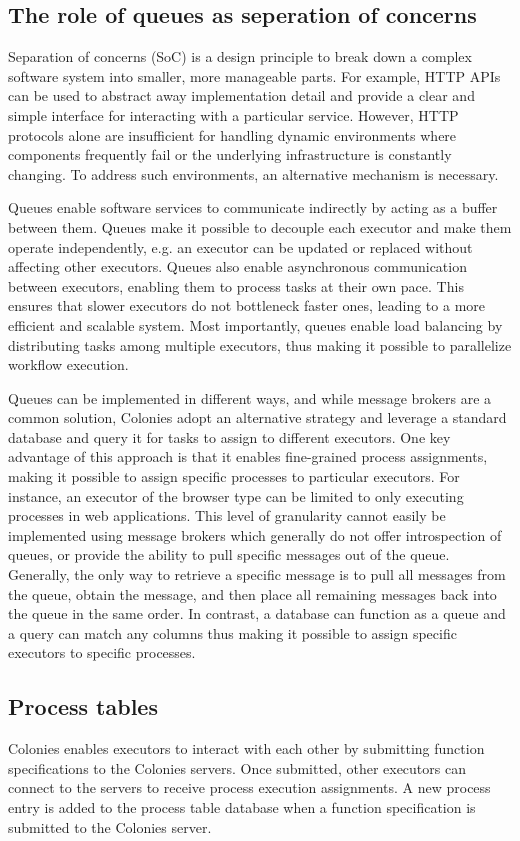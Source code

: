 \documentclass{article}
\begin{document}
\subsection{The role of queues as seperation of concerns}
Separation of concerns (SoC) is a design principle to break down a complex software system into smaller, more manageable parts. For example, HTTP APIs can be used to abstract away implementation detail and provide a clear and simple interface for interacting with a particular service. However, HTTP protocols alone are insufficient for handling dynamic environments where components frequently fail or the underlying infrastructure is constantly changing. To address such environments, an alternative mechanism is necessary. 

Queues enable software services to communicate indirectly by acting as a buffer between them. Queues make it possible to decouple each executor and make them operate independently, e.g. an executor can be updated or replaced without affecting other executors. Queues also enable asynchronous communication between executors, enabling them to process tasks at their own pace. This ensures that slower executors do not bottleneck faster ones, leading to a more efficient and scalable system. Most importantly, queues enable load balancing by distributing tasks among multiple executors, thus making it possible to parallelize workflow execution. 

Queues can be implemented in different ways, and while message brokers are a common solution, Colonies adopt an alternative strategy and leverage a standard database and query it for tasks to assign to different executors. One key advantage of this approach is that it enables fine-grained process assignments, making it possible to assign specific processes to particular executors. For instance, an executor of the browser type can be limited to only executing processes in web applications. This level of granularity cannot easily be implemented using message brokers which generally do not offer introspection of queues, or provide the ability to pull specific messages out of the queue. Generally, the only way to retrieve a specific message is to pull all messages from the queue, obtain the message, and then place all remaining messages back into the queue in the same order. In contrast, a database can function as a queue and a query can match any columns thus making it possible to assign specific executors to specific processes.

\subsection{Process tables}
Colonies enables executors to interact with each other by submitting function specifications to the Colonies servers. Once submitted, other executors can connect to the servers to receive process execution assignments. A new process entry is added to the process table database when a function specification is submitted to the Colonies server.
\end{document}
